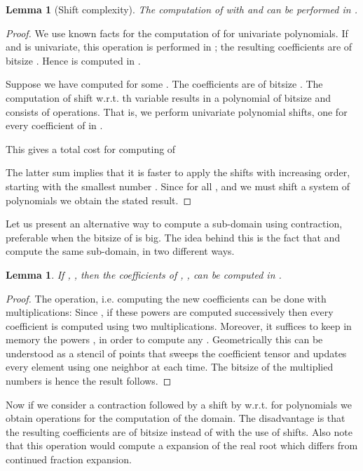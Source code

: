 \documentclass{sig-alternate}
\newtheorem{lemma}[theorem]{Lemma}
\begin{document}
\begin{lemma}[{Shift complexity}] \label{shiftComplexity} The
  computation of  with  and
   can be performed in .
\end{lemma}
\begin{proof}
  We use known facts for the computation of  for
  univariate polynomials.  If  and  is
  univariate, this operation is performed in
  ; the resulting coefficients are of
  bitsize  \cite{gg-shift-1997}. 
  Hence  is
  computed in .

  Suppose we have computed 
  for some . The coefficients are of bitsize . The computation of shift w.r.t. th
  variable  results in a
  polynomial of bitsize  and
  consists of 
  operations. That is, we perform  univariate polynomial
  shifts, one for every coefficient of  in
  .

  This gives a total cost for computing  of

The latter sum implies that it is faster to apply the shifts with
increasing order, starting with the smallest number . Since
 for all , and we must shift a system of
 polynomials we obtain the stated result.
\end{proof}

Let us present an alternative way to compute a sub-domain using
contraction, preferable when the bitsize of  is big.  The
idea behind this is the fact that  and  compute the same
sub-domain, in two different ways. 

\begin{lemma} \label{contractComplexity} If , ,
  then the coefficients of , , can be computed in  .
\end{lemma}
\begin{proof}
  The operation, i.e. computing the new coefficients  can be done with  multiplications: Since
  , 
  if these powers are computed
  successively then every coefficient is computed using two
  multiplications. Moreover, it suffices to keep in memory the 
  powers ,
   in order to compute any . Geometrically this can be understood as a stencil of 
  points that sweeps the coefficient tensor and updates every element
  using one neighbor at each time. The bitsize of the multiplied
  numbers is  hence the result follows.
\end{proof}

Now if we consider a contraction followed by a shift by 
w.r.t.  for  polynomials we obtain  operations for the computation of the
domain. The disadvantage is that the resulting coefficients are of
bitsize  instead of  with the
use of shifts. Also note that this operation would compute a expansion
of the real root which differs from  continued fraction expansion.
\end{document}
